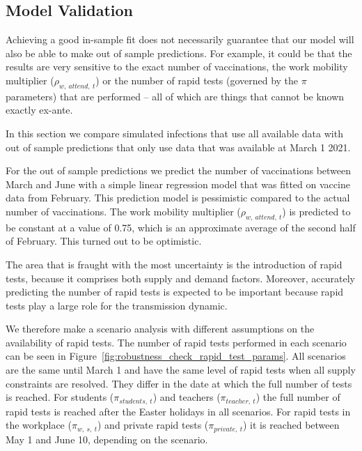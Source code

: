 \subsection{Model Validation}
\label{subsec:model_validation}

Achieving a good in-sample fit does not necessarily guarantee that our model will also be
able to make out of sample predictions. For example, it could be that the results are
very sensitive to the exact number of vaccinations, the work mobility multiplier
($\rho_{w,\:attend,\:t}$) or the number of rapid tests (governed by the $\pi$ parameters)
that are performed -- all of which are things that cannot be known exactly ex-ante.

In this section we compare simulated infections that use all available data with
out of sample predictions that only use data that was available at March 1 2021.

For the out of sample predictions we predict the number of vaccinations between March and
June with a simple linear regression model that was fitted on vaccine data from February.
This prediction model is pessimistic compared to the actual number of vaccinations. The
work mobility multiplier ($\rho_{w,\:attend,\:t}$) is predicted to be constant at a value
of 0.75, which is an approximate average of the second half of February. This turned out
to be optimistic.

The area that is fraught with the most uncertainty is the introduction of rapid tests,
because it comprises both supply and demand factors. Moreover, accurately predicting the
number of rapid tests is expected to be important because rapid tests play a large role
for the transmission dynamic.

We therefore make a scenario analysis with different assumptions on the availability of
rapid tests. The number of rapid tests performed in each scenario can be seen in
Figure~\ref{fig:robustness_check_rapid_test_params}. All scenarios are the same until
March 1 and have the same level of rapid tests when all supply constraints are resolved.
They differ in the date at which the full number of tests is reached. For students
($\pi_{students,\:t}$) and teachers ($\pi_{teacher,\:t}$) the full number of rapid tests
is reached after the Easter holidays in all scenarios. For rapid tests in the workplace
($\pi_{w,\:s,\:t}$) and private rapid tests ($\pi_{private,\:t}$) it is reached between
May 1 and June 10, depending on the scenario.


